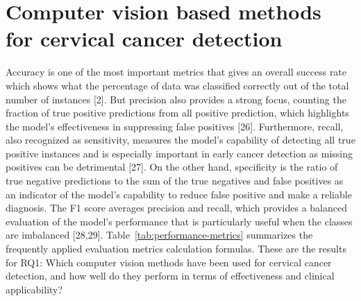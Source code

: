 \documentclass[final,5p,times,twocolumn,authoryear]{elsarticle}
\begin{document}
\section{Computer vision based methods for cervical cancer detection}
Accuracy is one of the most important metrics that gives an overall success rate which shows what the percentage of data was classified correctly out of the total number of instances [2]. But precision also provides a strong focus, counting the fraction of true positive predictions from all positive prediction, which highlights the model’s effectiveness in suppressing false positives [26]. Furthermore, recall, also recognized as sensitivity, measures the model’s capability of detecting all true positive instances and is especially important in early cancer detection as missing positives can be detrimental [27]. On the other hand, specificity is the ratio of true negative predictions to the sum of the true negatives and false positives as an indicator of the model’s capability to reduce false positive and make a reliable diagnosis. The F1 score averages precision and recall, which provides a balanced evaluation of the model’s performance that is particularly useful when the classes are imbalanced [28,29]. Table~\ref{tab:performance-metrics} summarizes the frequently applied evaluation metrics calculation formulas.
These are the results for RQ1: Which computer vision methods have been used for cervical cancer detection, and how well do they perform in terms of effectiveness and clinical applicability?
\end{document}
